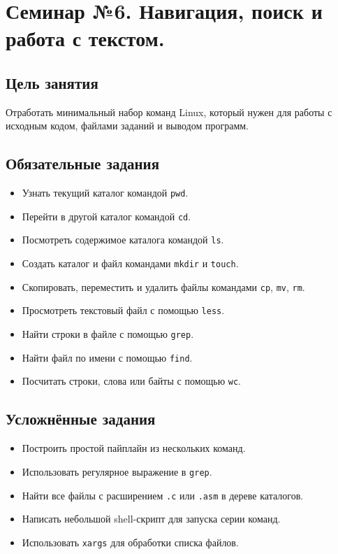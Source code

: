 \newpage
\section{Семинар №6. Навигация, поиск и работа с текстом.}

\subsection*{Цель занятия}
Отработать минимальный набор команд Linux, который нужен для работы с исходным кодом, файлами заданий и выводом программ.

\subsection*{Обязательные задания}
\begin{itemize}
    \item Узнать текущий каталог командой \texttt{pwd}.
    \item Перейти в другой каталог командой \texttt{cd}.
    \item Посмотреть содержимое каталога командой \texttt{ls}.
    \item Создать каталог и файл командами \texttt{mkdir} и \texttt{touch}.
    \item Скопировать, переместить и удалить файлы командами \texttt{cp}, \texttt{mv}, \texttt{rm}.
    \item Просмотреть текстовый файл с помощью \texttt{less}.
    \item Найти строки в файле с помощью \texttt{grep}.
    \item Найти файл по имени с помощью \texttt{find}.
    \item Посчитать строки, слова или байты с помощью \texttt{wc}.
\end{itemize}

\subsection*{Усложнённые задания}
\begin{itemize}
    \item Построить простой пайплайн из нескольких команд.
    \item Использовать регулярное выражение в \texttt{grep}.
    \item Найти все файлы с расширением \texttt{.c} или \texttt{.asm} в дереве каталогов.
    \item Написать небольшой shell-скрипт для запуска серии команд.
    \item Использовать \texttt{xargs} для обработки списка файлов.
\end{itemize}

